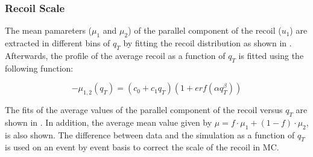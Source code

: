 \subsubsection{Recoil Scale}\label{sec:WBoson_Corrections_MET_Rscale}

The mean pamareters ($\mu_{1}$ and $\mu_{2}$) of the parallel component of the recoil ($u_{1}$) are extracted in different bins of $q_{T}$ by fitting the recoil distribution as shown in . Afterwards, the profile of the average recoil as a function of $q_{T}$ is fitted using the following function: 

\begin{equation}\label{eq:equparparam} 
-\mu_{1,2}(q_{T}) = (c_{0} + c_{1}q_{T})(1 + erf(\alpha q_{T}^{\beta}))
\end{equation}

The fits of the average values of the parallel component of the recoil versus $q_{T}$ are shown in . In addition, the average mean value given by $\mu = f \cdot \mu_{1} + (1 - f) \cdot \mu_{2}$, is also shown. The difference between data and the simulation as a function of $q_{T}$ is used on an event by event basis to correct the scale of the recoil in MC.

